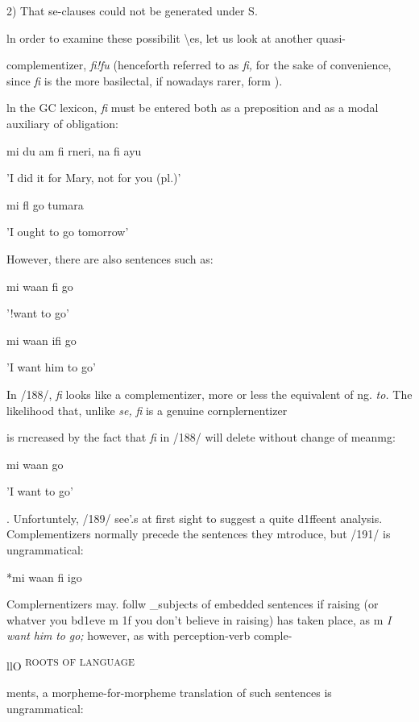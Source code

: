 2) That se-clauses could not be generated under S.

ln order to examine these possibilit {\textbackslash}es, let us look at another quasi{}-


complementizer, \textit{fi!fu }(henceforth referred to as \textit{fi, }for the sake of convenience, since \textit{fi} is the more basilectal, if nowadays rarer, form ).

ln the GC lexicon, \textit{fi }must be entered both as a preposition and as a modal auxiliary of obligation:

\ea\label{ex:186}
 mi du am fi rneri, na fi ayu
\glt
\z

'I did it for Mary, not for you (pl.)'

\ea\label{ex:187}
 mi fl go tumara
\glt
\z

'I ought to go tomorrow'

However, there are also sentences such as:

\ea\label{ex:188}
 mi waan fi go
\glt
\z

'!want to go'

\ea\label{ex:189}
 mi waan ifi go
\glt
\z

'I want him to go'

In /188/, \textit{fi} looks like a complementizer, more or less the equivalent of ng. \textit{to.} The likelihood that, unlike \textit{se,} \textit{fi} is a genuine cornplernentizer

is rncreased by the fact that \textit{fi }in /188/ will delete without change of meanmg:

\ea\label{ex:190}
 mi waan go
\glt
\z

'I want to go'

. Unfortuntely, /189/ see'.{\textquotedbl}s at first sight to suggest a quite d1ffeent analysis. Complementizers normally precede the sentences they mtroduce, but /191/ is ungrammatical:

\ea\label{ex:191}
 *mi waan fi igo
\glt
\z

Complernentizers may. follw \_subjects of embedded sentences if raising (or whatver you bd1eve m 1f you don't believe in raising) has taken place, as m \textit{I} \textit{want} \textit{him} \textit{to} \textit{go;} however, as with perception-verb comple-

llO \textsuperscript{ROOTS} \textsuperscript{OF} \textsuperscript{LANGUAGE}

ments, a morpheme-for-morpheme translation of such sentences is ungrammatical:

